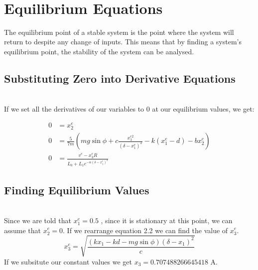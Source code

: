~\\
\section{Equilibrium Equations}
The equilibrium point of a stable system is the point where the system will return to despite any change of
inputs. This means that by finding a system’s equilibrium point, the stability of the system can be analysed.
\subsection*{Substituting Zero into Derivative Equations}\hfill \\
If we set all the derivatives of our variables to 0 at our equilibrium values, we get:

\begin{align}
    0 &= x_2^{e}\\
    0 &= \frac{5}{7m}  \left(mg\sin{\phi} + c\frac{x_3^{e2}}{(\delta - x_1^{e})^2} -k(x_1^{e}-d) -bx_2^{e}   \right)\\
    0 &= \frac{v^{e} - x_3^{e}R}{L_0 + L_1e^{-\alpha (\delta - x_1^{e})^2}}
\end{align}
\subsection*{Finding Equilibrium Values}
\hfill \\
Since we are told that $x^e_1 = 0.5$ , since it is stationary at this point, we can assume that $x^e_2 = 0$. If we rearrange equation 2.2 we can find the value of $x^e_3 $.
\begin{equation}
    x_3^e = \sqrt{\frac{(kx_1 - kd - mg\sin\phi)(\delta - x_1)^2}{c}}
\end{equation}
If we subsitute our constant values we get $x_3 = 0.707488266645418 $ A.